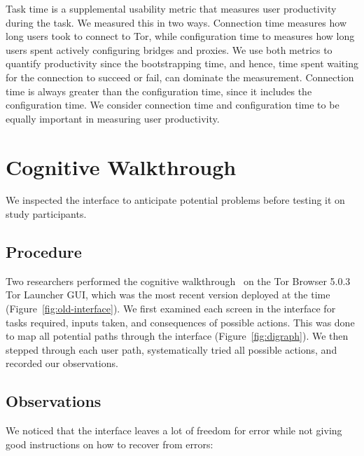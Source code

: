 \documentclass[USenglish,oneside,twocolumn]{article}
\begin{document}
Task time is a supplemental usability metric that measures user productivity during the task. We measured this in two ways. Connection time measures how long users took to connect to Tor, while configuration time to measures how long users spent actively configuring bridges and proxies. We use both metrics to quantify productivity since the bootstrapping time, and hence, time spent waiting for the connection to succeed or fail, can dominate the measurement. Connection time is always greater than the configuration time, since it includes the configuration time. We consider connection time and configuration time to be equally important in measuring user productivity. 


\section{Cognitive Walkthrough}
\label{sec:inspection}
We inspected the interface to anticipate potential problems before testing it on study participants.

\subsection{Procedure} 
Two researchers performed the cognitive walkthrough~\cite{cognitive-walkthrough} on the Tor Browser 5.0.3 Tor Launcher GUI, which was the most recent version deployed at the time (Figure~\ref{fig:old-interface}). We first examined each screen in the interface for tasks required, inputs taken, and consequences of possible actions. This was done to map all potential paths through the interface (Figure~\ref{fig:digraph}). We then stepped through each user path, systematically tried all possible actions, and recorded our observations. 

\subsection{Observations}
We noticed that the interface leaves a lot of freedom for error while not giving good instructions on how to recover from errors: \\
\end{document}
